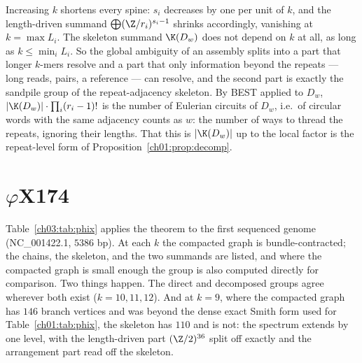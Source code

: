\begin{remark}\label{ch03:rem:k}
Increasing $k$ shortens every spine: $s_i$ decreases by one per unit of $k$, and the
length-driven summand $\bigoplus(\Z/r_i)^{s_i-1}$ shrinks accordingly, vanishing at
$k=\max L_i$. The skeleton summand $\K(D_w)$ does not depend on $k$ at all, as long as
$k\le\min_iL_i$. So the global ambiguity of an assembly splits into a part that longer
$k$-mers resolve and a part that only information beyond the repeats --- long reads,
pairs, a reference --- can resolve, and the second part is exactly the sandpile group of
the repeat-adjacency skeleton. By BEST applied to $D_w$, $|\K(D_w)|\cdot\prod_i(r_i-1)!$ is the number
of Eulerian circuits of $D_w$, i.e.\ of circular words with the same adjacency counts as
$w$: the number of ways to thread the repeats, ignoring their lengths. That this is
$|\K(D_w)|$ up to the local factor is the repeat-level form of Proposition~\ref{ch01:prop:decomp}.
\end{remark}

\section{\texorpdfstring{$\varphi$X174}{phiX174}}\label{ch03:sec:phix}

Table~\ref{ch03:tab:phix} applies the theorem to the first sequenced genome (NC\_001422.1,
$5386$ bp). At each $k$ the compacted graph is bundle-contracted; the chains, the
skeleton, and the two summands are listed, and where the compacted graph is small enough
the group is also computed directly for comparison. Two things happen. The direct and
decomposed groups agree wherever both exist ($k=10,11,12$). And at $k=9$, where the
compacted graph has $146$ branch vertices and was beyond the dense exact Smith form used
for Table~\ref{ch01:tab:phix}, the skeleton has $110$ and is not: the spectrum extends by one level, with
the length-driven part $(\Z/2)^{36}$ split off exactly and the arrangement part read off
the skeleton.

